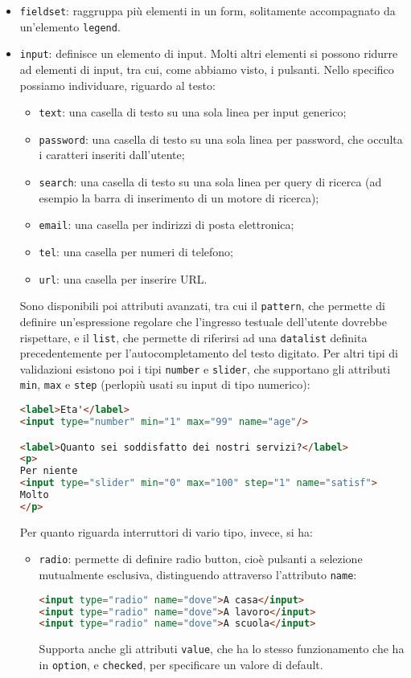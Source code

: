 \documentclass[a4paper,11pt]{article}
\begin{document}
\begin{itemize}
	\item \lstinline|fieldset|: raggruppa più elementi in un form, solitamente accompagnato da un'elemento \lstinline|legend|.

	\item \lstinline|input|: definisce un elemento di input. Molti altri elementi si possono ridurre ad elementi di input, tra cui, come abbiamo visto, i pulsanti. Nello specifico possiamo individuare, riguardo al testo:
		\begin{itemize}
			\item \lstinline|text|: una casella di testo su una sola linea per input generico;
			\item \lstinline|password|: una casella di testo su una sola linea per password, che occulta i caratteri inseriti dall'utente;
			\item \lstinline|search|: una casella di testo su una sola linea per query di ricerca (ad esempio la barra di inserimento di un motore di ricerca);
			\item \lstinline|email|: una casella per indirizzi di posta elettronica;
			\item \lstinline|tel|: una casella per numeri di telefono;
			\item \lstinline|url|: una casella per inserire URL.
		\end{itemize}

	Sono disponibili poi attributi avanzati, tra cui il \lstinline|pattern|, che permette di definire un'espressione regolare che l'ingresso testuale dell'utente dovrebbe rispettare, e il \lstinline|list|, che permette di riferirsi ad una \lstinline|datalist| definita precedentemente per l'autocompletamento del testo digitato.
Per altri tipi di validazioni esistono poi i tipi \lstinline|number| e \lstinline|slider|, che supportano gli attributi \lstinline|min|, \lstinline|max| e \lstinline|step| (perlopiù usati su input di tipo numerico):
\begin{lstlisting}[language=html, style=codestyle]	
<label>Eta'</label>
<input type="number" min="1" max="99" name="age"/>

<label>Quanto sei soddisfatto dei nostri servizi?</label>
<p>
Per niente
<input type="slider" min="0" max="100" step="1" name="satisf">
Molto
</p>
\end{lstlisting}

	Per quanto riguarda interruttori di vario tipo, invece, si ha:
	\begin{itemize}
		\item \lstinline|radio|: permette di definire radio button, cioè pulsanti a selezione mutualmente esclusiva, distinguendo attraverso l'attributo \lstinline|name|:
\begin{lstlisting}[language=html, style=codestyle]	
<input type="radio" name="dove">A casa</input>
<input type="radio" name="dove">A lavoro</input>
<input type="radio" name="dove">A scuola</input>
\end{lstlisting}
	Supporta anche gli attributi \lstinline|value|, che ha lo stesso funzionamento che ha in \lstinline|option|, e \lstinline|checked|, per specificare un valore di default.
	

\end{itemize}
\end{itemize}
\end{document}
